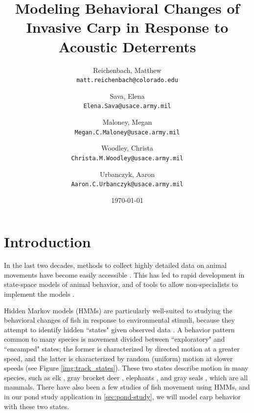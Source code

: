 \documentclass[12pt]{article}
\begin{document}
	\title{Modeling Behavioral Changes of Invasive Carp in Response to Acoustic Deterrents}
	\author{
		Reichenbach, Matthew \\
		\texttt{matt.reichenbach@colorado.edu}
		\and
		Sava, Elena \\
		\texttt{Elena.Sava@usace.army.mil}
		\and
		Maloney, Megan \\
		\texttt{Megan.C.Maloney@usace.army.mil}
		\and
		Woodley, Christa \\
		\texttt{Christa.M.Woodley@usace.army.mil}
		\and
		Urbanczyk, Aaron \\
		\texttt{Aaron.C.Urbanczyk@usace.army.mil}
	}
	\date{\today}
	
	\maketitle
	
	\section{Introduction}
	
	In the last two decades, methods to collect highly detailed data on animal movements have become easily accessible \cite{McConnell2010, Tomkiewicz2010}. This has led to rapid development in state-space models of animal behavior, and of tools to allow non-specialists to implement the models \cite{Johnson2008, McClintock2012, Michelot2016, Whoriskey2017, McClintock2018}.
	
	Hidden Markov models (HMMs) are particularly well-suited to studying the behavioral changes of fish in response to environmental stimuli, because they attempt to identify hidden ``states" given observed data \cite{Rabiner1989}. A behavior pattern common to many species is movement divided between ``exploratory" and ``encamped" states; the former is characterized by directed motion at a greater speed, and the latter is characterized by random (uniform) motion at slower speeds (see Figure \ref{img:track_states}). These two states describe motion in many species, such as elk \cite{Morales2004, Fryxell2008}, gray brocket deer \cite{Grotta-Neto2019}, elephants \cite{Roever2014, Vogel2019}, and gray seals \cite{Breed2009}, which are all mammals. There have also been a few studies of fish movement using HMMs, and in our pond study application in \ref{sec:pond-study}, we will model carp behavior with these two states.
\end{document}
